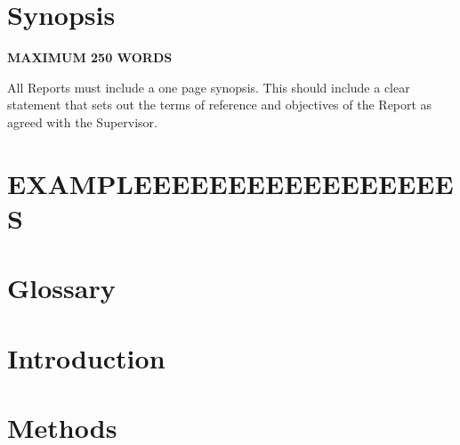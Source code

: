 \documentclass[a4paper,11, oneside]{article}
\begin{document}
%

\section*{Synopsis}
\textbf{MAXIMUM 250 WORDS}

All Reports must include a one page synopsis. This should include a clear statement that sets out the terms of reference and objectives of the Report as agreed with the Supervisor.
%


\pagebreak

%


\section*{EXAMPLEEEEEEEEEEEEEEEEES}



\section*{Glossary}


\pagebreak

\tableofcontents
\pagebreak
\listoffigures
\listoftables
\pagebreak
\newpage


\cleardoublepage{}

\section{Introduction}

\pagebreak

\section{Methods}
\label{ch:methods}

\pagebreak
\end{document}
